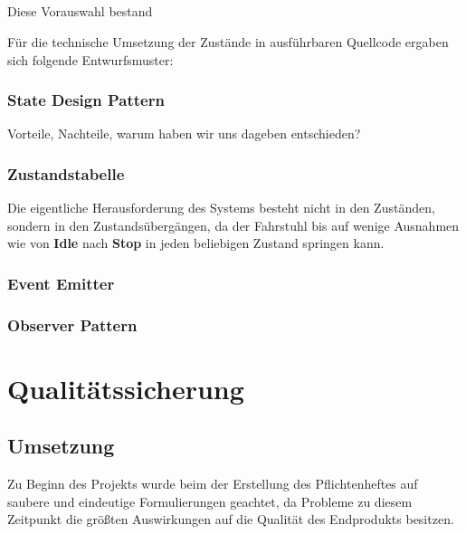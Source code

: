 \paragraph{}Diese Vorauswahl bestand 

Für die technische Umsetzung der Zustände in ausführbaren Quellcode ergaben sich folgende Entwurfsmuster:
\subsection*{State Design Pattern}
Vorteile, Nachteile, warum haben wir uns dageben entschieden?
\subsection*{Zustandstabelle}

Die eigentliche Herausforderung des Systems besteht nicht in den Zuständen, sondern in den Zustandsübergängen, da der Fahrstuhl bis auf wenige Ausnahmen wie von \textbf{Idle} nach \textbf{Stop} in jeden beliebigen Zustand springen kann.
\subsection*{Event Emitter}
\subsection{Observer Pattern}

\chapter{Qualitätssicherung}
\section{Umsetzung}
Zu Beginn des Projekts wurde beim der Erstellung des Pflichtenheftes auf saubere und eindeutige Formulierungen geachtet, da Probleme zu diesem Zeitpunkt die größten Auswirkungen auf die Qualität des Endprodukts besitzen.


